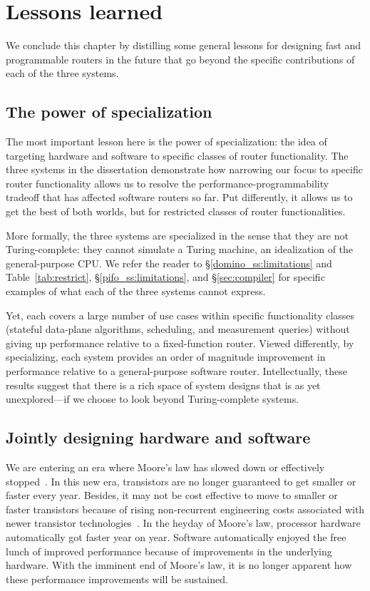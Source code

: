 \section{Lessons learned} We conclude this chapter by distilling some general
lessons for designing fast and programmable routers in the future that go
beyond the specific contributions of each of the three systems.

\subsection{The power of specialization} The most important lesson here is the
power of specialization: the idea of targeting hardware and software to
specific classes of router functionality.  The three systems in the
dissertation demonstrate how narrowing our focus to specific router
functionality allows us to resolve the performance-programmability tradeoff
that has affected software routers so far. Put differently, it allows us to get
the best of both worlds, but for restricted classes of router functionalities.

More formally, the three systems are specialized in the sense that they are not
Turing-complete: they cannot simulate a Turing machine, an idealization of the
general-purpose CPU.  We refer the reader to \S\ref{domino_ss:limitations} and
Table~\ref{tab:restrict}, \S\ref{pifo_ss:limitations}, and \S\ref{sec:compiler}
for specific examples of what each of the three systems cannot express.

Yet, each covers a large number of use cases within specific functionality
classes (stateful data-plane algorithms, scheduling, and measurement queries)
without giving up performance relative to a fixed-function router. Viewed
differently, by specializing, each system provides an order of magnitude
improvement in performance relative to a general-purpose software router.
Intellectually, these results suggest that there is a rich space of system
designs that is as yet unexplored---if we choose to look beyond Turing-complete
systems. 

\subsection{Jointly designing hardware and software} We are entering an era
where Moore's law has slowed down or effectively stopped~\cite{dark_silicon,
four_horsemen}.  In this new era, transistors are no longer guaranteed to get
smaller or faster every year. Besides, it may not be cost effective to move to
smaller or faster transistors because of rising non-recurrent engineering costs
associated with newer transistor technologies~\cite{nre_moonwalk}. In the
heyday of Moore's law, processor hardware automatically got faster year on
year. Software automatically enjoyed the free lunch of improved performance
because of improvements in the underlying hardware. With the imminent end of
Moore's law, it is no longer apparent how these performance improvements will
be sustained.

